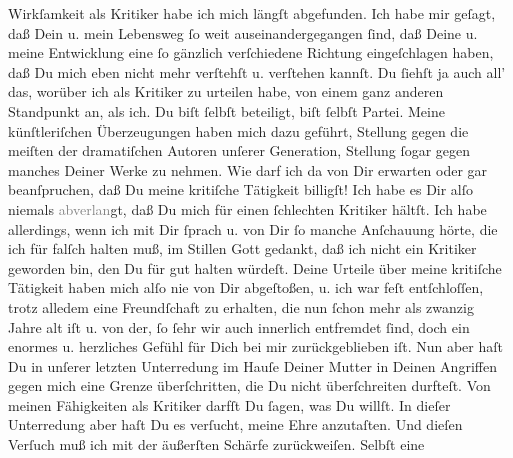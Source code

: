 \begin{ledgroupsized}[t]{13cm}
               Wirkſamkeit als Kritiker habe ich mich \introOben{}längſt\introOben{} abgefunden.
               Ich habe mir geſagt, daß Dein u. mein Lebensweg ſo
               weit auseinandergegangen ſind, {\pb}daß Deine u. meine
               Entwicklung eine ſo gänzlich verſchiedene Richtung eingeſchlagen haben, daß Du mich
               eben nicht mehr verſtehſt u. verſtehen kannſt. Du ſiehſt ja auch all’ das, worüber
               ich als Kritiker zu urteilen habe, von einem ganz anderen Standpunkt an, als ich. Du
               biſt ſelbſt beteiligt, biſt ſelbſt Partei. Meine künſtleriſchen Überzeugungen haben
               mich dazu geführt, Stellung gegen  die meiſten der dramatiſchen Autoren unſerer Generation, Stellung ſogar gegen
               manches Deiner Werke zu nehmen. {\pb}Wie darf ich da
               von Dir erwarten oder gar beanſpruchen, daß Du meine kritiſche Tätigkeit
               billigſt!\pend
           \pstart
           Ich habe es Dir alſo niemals \textcolor{gray}{abverlan}gt, daß Du mich für einen
               ſchlechten Kritiker hältſt. Ich habe allerdings, wenn ich mit Dir ſprach u. von Dir
               ſo manche Anſchauung hörte, die ich für falſch halten muß, im Stillen Gott gedankt,
               daß ich nicht ein Kritiker geworden bin, den Du für gut halten würdeſt.\pend
           \pstart
           {\pb}Deine Urteile über meine kritiſche Tätigkeit
               haben mich alſo nie von Dir abgeſtoßen, u. ich war feſt entſchloſſen, trotz alledem
                  \strikeout{\textcolor{gray}{Dir}} eine Freundſchaft zu erhalten, die nun ſchon mehr als zwanzig Jahre alt
                  iſt\strikeout{,} u. von der, ſo ſehr wir auch innerlich
               entfremdet ſind, doch ein enormes u. herzliches Gefühl für Dich bei mir
               zurückgeblieben iſt.\strikeout{\textcolor{gray}{×}}\pend
           \pstart
           Nun aber haſt Du in unſerer letzten Unterredung im Hauſe Deiner Mutter in Deinen Angriffen gegen mich eine Grenze
               überſchritten, die Du {\pb}nicht überſchreiten
               durfteſt. Von meinen Fähigkeiten als Kritiker darfſt Du ſagen, was Du willſt. In
               dieſer Unterredung aber haſt Du es verſucht, meine Ehre anzutaſten. Und dieſen
               Verſuch muß ich mit der äußerſten Schärfe zurückweiſen. Selbſt eine

\end{ledgroupsized}
